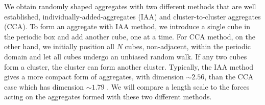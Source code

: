 \par
We obtain randomly shaped aggregates with two different methods that are well established, individually-added-aggregates (IAA) and cluster-to-cluster aggregates (CCA). 
To form an aggregate with IAA method, we introduce a single cube in the periodic box and add another cube, one at a time. For CCA method, on the other hand, we initially position all $N$ cubes, non-adjacent, within the periodic domain and let all cubes undergo an unbiased random walk. If any two cubes form a cluster, the cluster can form another cluster.
Typically, the IAA method gives a more compact form of aggregates, with dimension $\sim 2.56$, than the CCA case which has dimension $\sim 1.79$ \cite{witten_diffusion-limited_1981, kaye_random_2008}.
 We will compare a length scale to the forces acting on the aggregates formed with these two different methods.
%
%
%
